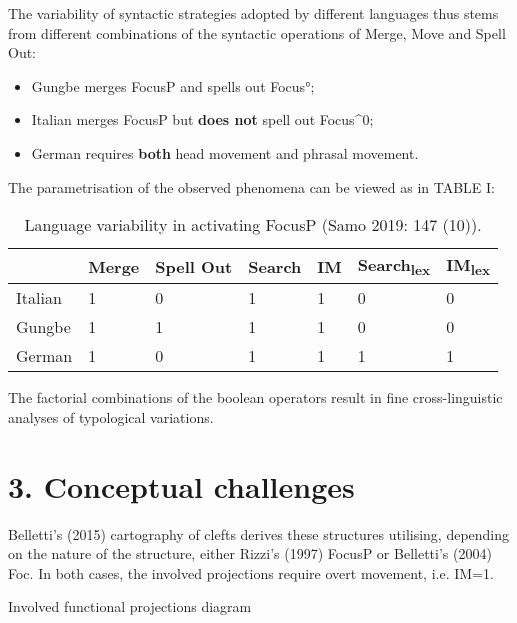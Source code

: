 \documentclass[fleqn,10pt]{wlscirep}
\begin{document}
\noindent The variability of syntactic strategies adopted by different languages thus stems from different combinations of the syntactic operations of Merge, Move and Spell Out: 

\begin{itemize}
\item Gungbe merges FocusP and spells out Focus°; 
\item \vspace*{-2mm} Italian merges FocusP but \textbf{does not} spell out Focus^0; 
\item \vspace*{-2mm} German requires \textbf{both} head movement and phrasal movement. 
\end{itemize}

\noindent The parametrisation of the observed phenomena can be viewed as in TABLE I:

\begin{table}[H]
    \centering
    \begin{tabular}{|l|l|l|l|l|l|l|}
    \hline
     & Merge & Spell Out & Search & IM & Search\textsubscript{lex} & IM\textsubscript{lex} \\
    \hline
    Italian & 1 & 0 & 1 & 1 & 0 & 0 \\
    \hline
    Gungbe & 1 & 1 & 1 & 1 & 0 & 0 \\
    \hline
    German & 1 & 0 & 1 & 1 & 1 & 1 \\
    \hline
    \end{tabular}
    \caption{\label{tab:samp}Language variability in activating FocusP (Samo 2019: 147 (10)).}
    \end{table}

\noindent The factorial combinations of the boolean operators result in fine cross-linguistic analyses of typological variations.


\section*{3. Conceptual challenges}

Belletti’s (2015) cartography of clefts derives these structures utilising, depending on the nature of the structure, either Rizzi’s (1997) FocusP or Belletti’s (2004) Foc. 
In both cases, the involved projections require overt movement, i.e. IM=1.

\begin{exe}
    \ex Involved functional projections diagram
\end{exe}
\end{document}
